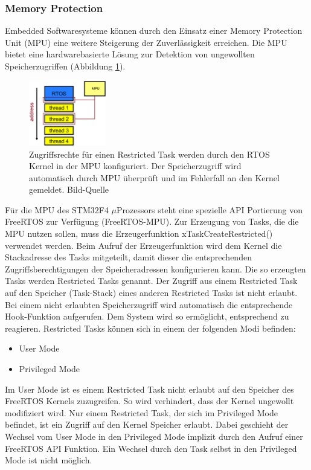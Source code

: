 \subsubsection{Memory Protection}
\label{sec:Memory Protection}
Embedded Softwaresysteme können durch den Einsatz einer Memory Protection Unit (MPU) eine weitere Steigerung der Zuverlässigkeit erreichen. Die MPU bietet eine hardwarebasierte Lösung zur Detektion von ungewollten Speicherzugriffen (Abbildung \ref{fig:AddressSpaceMMU}). 
\begin{figure}[htb]
	\centering
		\includegraphics[width=0.3\textwidth]{Pictures/EmbeddedCom/addressSpaceMMU}
	\caption{Zugriffsrechte für einen Restricted Task werden durch den RTOS Kernel in der MPU konfiguriert. Der Speicherzugriff wird automatisch durch MPU überprüft und im Fehlerfall an den Kernel gemeldet. Bild-Quelle~\protect{}}
	\label{fig:AddressSpaceMMU}
\end{figure} 
Für die MPU des STM32F4 $\mu$\-Pro\-zesso\-rs steht eine spezielle API Portierung von FreeRTOS zur Verfügung (FreeRTOS-MPU). Zur Erzeugung von Tasks, die die MPU nutzen sollen, muss die Erzeugerfunktion xTaskCreateRestricted() verwendet werden. Beim Aufruf der Erzeugerfunktion wird dem Kernel die Stackadresse des Tasks mitgeteilt, damit dieser die entsprechenden Zugriffsberechtigungen der Speicheradressen konfigurieren kann. Die so erzeugten Tasks werden Restricted Tasks genannt. Der Zugriff aus einem Restricted Task auf den Speicher (Task-Stack) eines anderen Restricted Tasks ist nicht erlaubt. Bei einem nicht erlaubten Speicherzugriff wird automatisch die entsprechende Hook-Funk\-tion aufgerufen. Dem System wird so ermöglicht, entsprechend zu reagieren. Restricted Tasks kön\-nen sich in einem der folgenden Modi befinden:
\begin{itemize}
	\item User Mode
	\item Privileged Mode 
\end{itemize}
Im User Mode ist es einem Restricted Task nicht erlaubt auf den Speicher des FreeRTOS Kernels zuzugreifen. So wird verhindert, dass der Kernel ungewollt modifiziert wird. Nur einem Restricted Task, der sich im Privileged Mode befindet, ist ein Zugriff auf den Kernel Speicher erlaubt. Dabei geschieht der Wechsel vom User Mode in den Privileged Mode implizit durch den Aufruf einer FreeRTOS API Funktion. Ein Wechsel durch den Task selbst in den Privileged Mode ist nicht möglich.
